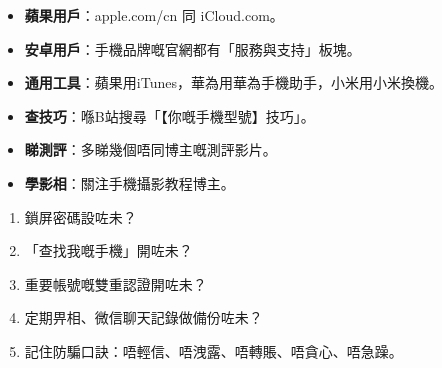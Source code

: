 

\begin{itemize}
  \item \textbf{蘋果用戶}：apple.com/cn 同 iCloud.com。
  \item \textbf{安卓用戶}：手機品牌嘅官網都有「服務與支持」板塊。
  \item \textbf{通用工具}：蘋果用iTunes，華為用華為手機助手，小米用小米換機。
\end{itemize}


\begin{itemize}
  \item \textbf{查技巧}：喺B站搜尋「【你嘅手機型號】技巧」。
  \item \textbf{睇測評}：多睇幾個唔同博主嘅測評影片。
  \item \textbf{學影相}：關注手機攝影教程博主。
\end{itemize}


\begin{enumerate}
  \item 鎖屏密碼設咗未？
  \item 「查找我嘅手機」開咗未？
  \item 重要帳號嘅雙重認證開咗未？
  \item 定期畀相、微信聊天記錄做備份咗未？
  \item 記住防騙口訣：唔輕信、唔洩露、唔轉賬、唔貪心、唔急躁。
\end{enumerate}
